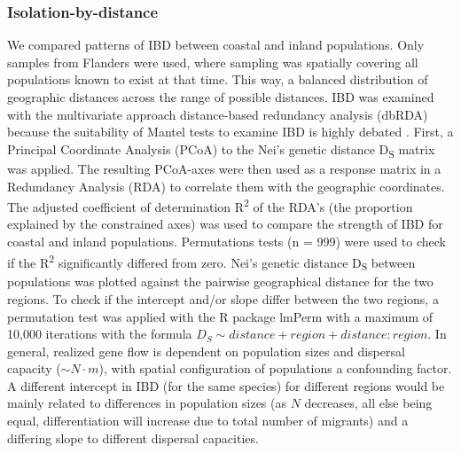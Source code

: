 \documentclass[10pt, twoside]{book} %
\begin{document}
	\subsubsection{Isolation-by-distance}
	We compared patterns of IBD between coastal and inland populations. Only samples from Flanders were used, where sampling was spatially covering all populations known to exist at that time. This way, a balanced distribution of geographic distances across the range of possible distances. IBD was examined with the multivariate approach distance-based redundancy analysis (dbRDA) \citep{diniz-filho2013} because the suitability of Mantel tests to examine IBD is highly debated \citep{meirmans2015}. First, a Principal Coordinate Analysis (PCoA) to the Nei's genetic distance D\textsubscript{S} matrix was applied. The resulting PCoA-axes were then used as a response matrix in a Redundancy Analysis (RDA) to correlate them with the geographic coordinates. The adjusted coefficient of determination R\textsuperscript{2} of the RDA's (the proportion explained by the constrained axes) was used to compare the strength of IBD for coastal and inland populations. Permutations tests (n = 999) were used to check if the R\textsuperscript{2} significantly differed from zero. Nei's genetic distance D\textsubscript{S} between populations was plotted against the pairwise geographical distance for the two regions. To check if the intercept and/or slope differ between the two regions, a permutation test was applied with the R package lmPerm with a maximum of 10,000 iterations \citep{wheeler2016} with the formula $D_S \sim distance + region + distance:region$. In general, realized gene flow is dependent on population sizes and dispersal capacity ($\sim N\cdot m$), with spatial configuration of populations a confounding factor. A different intercept in IBD (for the same species) for different regions would be mainly related to differences in population sizes (as $N$ decreases, all else being equal, differentiation will increase due to total number of migrants) and a differing slope to different dispersal capacities.\\
	
\end{document}
